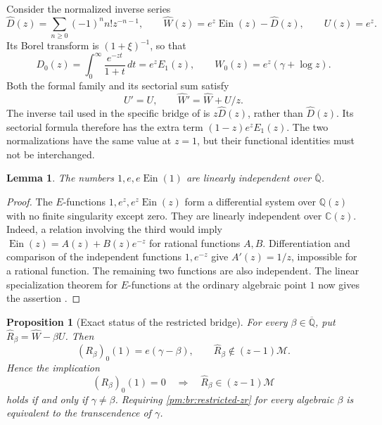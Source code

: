 \documentclass[11pt,a4paper]{article}
\newtheorem{proposition}[theorem]{Proposition}
\newtheorem{lemma}[theorem]{Lemma}
\theoremstyle{definition}
\theoremstyle{remark}
\numberwithin{equation}{section}
\begin{document}
Consider the normalized inverse series
\begin{equation}\label{pm:br:normalized-family}
 \widehat D(z)=\sum_{n\geq0}(-1)^n n!z^{-n-1},\qquad
 \widehat W(z)=e^z\operatorname{Ein}(z)-\widehat D(z),\qquad U(z)=e^z.
\end{equation}
Its Borel transform is \((1+\xi)^{-1}\), so that
\begin{equation}\label{pm:br:laplace}
 D_0(z)=\int_0^\infty\frac{e^{-zt}}{1+t}\,dt=e^zE_1(z),
 \qquad W_0(z)=e^z(\gamma+\log z).
\end{equation}
Both the formal family and its sectorial sum satisfy
\begin{equation}\label{pm:br:system}
 U'=U,\qquad \widehat W'=\widehat W+U/z.
\end{equation}
The inverse tail used in the specific bridge of \cite{pm:KEIO001} is
\(z\widehat D(z)\), rather than \(\widehat D(z)\).  Its sectorial
formula therefore has the extra term \((1-z)e^zE_1(z)\).  The two
normalizations have the same value at \(z=1\), but their functional
identities must not be interchanged.

\begin{lemma}\label{pm:br:linear-values}
The numbers \(1,e,e\operatorname{Ein}(1)\) are linearly independent
over \(\overline{\mathbb Q}\).
\end{lemma}

\begin{proof}
The \(E\)-functions \(1,e^z,e^z\operatorname{Ein}(z)\) form a
differential system over \(\mathbb Q(z)\) with no finite singularity
except zero.  They are linearly independent over \(\mathbb C(z)\).
Indeed, a relation involving the third would imply
\(\operatorname{Ein}(z)=A(z)+B(z)e^{-z}\) for rational functions
\(A,B\).  Differentiation and comparison of the independent functions
\(1,e^{-z}\) give \(A'(z)=1/z\), impossible for a rational function.
The remaining two functions are also independent.  The linear
specialization theorem for \(E\)-functions at the ordinary algebraic
point \(1\) now gives the assertion \cite{pm:Beukers2006}.
\end{proof}

\begin{proposition}[Exact status of the restricted bridge]
\label{pm:br:zero-removal}
For every \(\beta\in\overline{\mathbb Q}\), put
\(\widehat R_\beta=\widehat W-\beta U\).  Then
\[
 (R_\beta)_0(1)=e(\gamma-\beta),\qquad
 \widehat R_\beta\notin(z-1)\mathcal M.
\]
Hence the implication
\begin{equation}\label{pm:br:restricted-zr}
 (R_\beta)_0(1)=0\quad\Longrightarrow\quad
                  \widehat R_\beta\in(z-1)\mathcal M
\end{equation}
holds if and only if \(\gamma\ne\beta\).  Requiring
\eqref{pm:br:restricted-zr} for every algebraic \(\beta\) is equivalent
to the transcendence of \(\gamma\).
\end{proposition}
\end{document}
